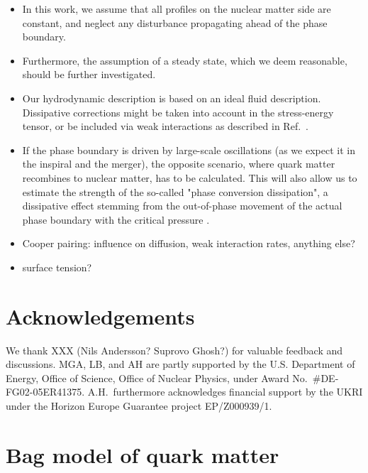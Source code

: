 \documentclass[10pt,superscriptaddress,
amsmath,aps,prc,twocolumn,nofootinbib,floatfix]{revtex4-1}
\begin{document}
{\begin{itemize}[leftmargin=*]
    \item In this work, we assume that all profiles on the nuclear matter side are constant, and neglect any disturbance propagating ahead of the phase boundary. 
    \item Furthermore, the assumption of a steady state, which we deem reasonable, should be further investigated.
    \item Our hydrodynamic description is based on an ideal fluid description. Dissipative corrections might be taken into account in the stress-energy tensor, or be included via weak interactions as described in Ref.~\cite{Most:2022yhe}.
        \item If the phase boundary is driven by large-scale oscillations (as we expect it in the inspiral and the merger), the opposite scenario, where quark matter recombines to nuclear matter, has to be calculated. This will also allow us to estimate the strength of the so-called "phase conversion dissipation", a dissipative effect stemming from the out-of-phase movement of the actual phase boundary with the critical pressure \cite{Alford:2014jha}.
        \item Cooper pairing: influence on diffusion, weak interaction rates, anything else?
        \item surface tension?
\end{itemize}
}
\section*{Acknowledgements} We thank XXX (Nils Andersson? Suprovo Ghosh?) for valuable feedback and discussions.
MGA, LB, and AH are partly supported by the U.S. Department of Energy, Office of Science, Office of Nuclear Physics, under Award No.~\#DE-FG02-05ER41375. A.H.~furthermore acknowledges financial support by the UKRI under the Horizon Europe Guarantee project EP/Z000939/1.


\appendix
\section{Bag model of quark matter}
\label{sec:bag_model}
\end{document}
